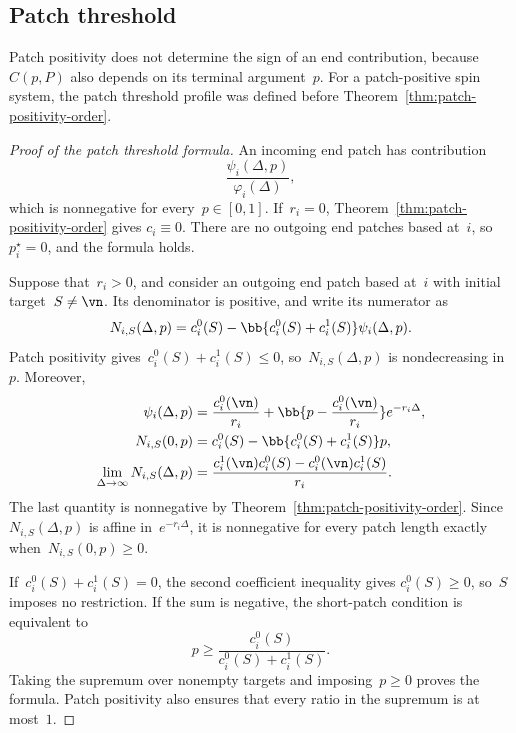 \subsection{Patch threshold}
\label{subsec:critical-density}

Patch positivity does not determine the sign of an end contribution, because
$C(p,P)$ also depends on its terminal argument~$p$. For a patch-positive spin
system, the patch threshold profile was defined before
Theorem~\ref{thm:patch-positivity-order}.

\begin{proof}[Proof of the patch threshold formula]
An incoming end patch has contribution
\begin{equation*}
\frac{\psi_i(\Delta,p)}{\varphi_i(\Delta)},
\end{equation*}
which is nonnegative for every~$p\in[0,1]$. If~$r_i=0$,
Theorem~\ref{thm:patch-positivity-order} gives
$c_i\equiv0$. There are no outgoing end patches based at~$i$, so~$p_i^\star=0$,
and the formula holds.

Suppose that~$r_i>0$, and consider an outgoing end patch based at~$i$ with
initial target~$S\neq\vn$. Its denominator is positive, and write its numerator
as
\begin{equation*}
N_{i,S}(\Delta,p)
=
c_i^0(S)-\bb{c_i^0(S)+c_i^1(S)}\psi_i(\Delta,p).
\end{equation*}
Patch positivity gives~$c_i^0(S)+c_i^1(S)\leq0$, so~$N_{i,S}(\Delta,p)$ is
nondecreasing in~$p$. Moreover,
\begin{align*}
\psi_i(\Delta,p)
&=
\frac{c_i^0(\vn)}{r_i}
+
\bb{p-\frac{c_i^0(\vn)}{r_i}}e^{-r_i\Delta},
\\
N_{i,S}(0,p)
&=
c_i^0(S)-\bb{c_i^0(S)+c_i^1(S)}p,
\\
\lim_{\Delta\to\infty}N_{i,S}(\Delta,p)
&=
\frac{c_i^1(\vn)c_i^0(S)-c_i^0(\vn)c_i^1(S)}{r_i}.
\end{align*}
The last quantity is nonnegative by
Theorem~\ref{thm:patch-positivity-order}. Since~$N_{i,S}(\Delta,p)$ is
affine in~$e^{-r_i\Delta}$, it is nonnegative for every patch length exactly
when~$N_{i,S}(0,p)\geq0$.

If~$c_i^0(S)+c_i^1(S)=0$, the second coefficient inequality gives
$c_i^0(S)\geq0$, so~$S$ imposes no restriction. If the sum is negative, the
short-patch condition is equivalent to
\begin{equation*}
p\geq
\frac{c_i^0(S)}{c_i^0(S)+c_i^1(S)}.
\end{equation*}
Taking the supremum over nonempty targets and imposing~$p\geq0$ proves the
formula. Patch positivity also ensures that every ratio in the supremum is at
most~$1$.
\end{proof}

